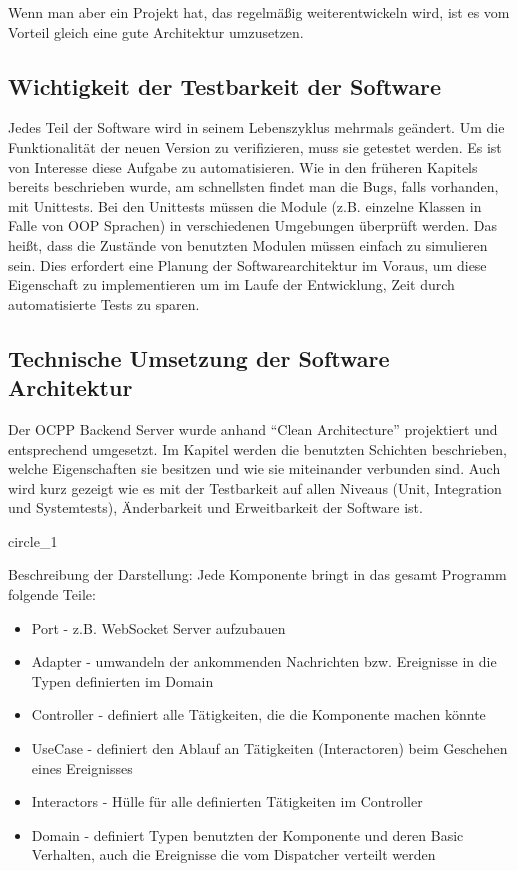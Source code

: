 \documentclass{article}
\begin{document}
    Wenn man aber ein Projekt hat, das regelmäßig weiterentwickeln wird, ist es vom Vorteil gleich eine gute Architektur umzusetzen.

    \subsection{Wichtigkeit der Testbarkeit der Software}
    Jedes Teil der Software wird in seinem Lebenszyklus mehrmals geändert. 
    Um die Funktionalität der neuen Version zu verifizieren, muss sie getestet werden.
    Es ist von Interesse diese Aufgabe zu automatisieren. 
    Wie in den früheren Kapitels bereits beschrieben wurde, am schnellsten findet man die Bugs, falls vorhanden, mit Unittests. 
    Bei den Unittests müssen die Module (z.B. einzelne Klassen in Falle von OOP Sprachen) in verschiedenen Umgebungen überprüft werden. 
    Das heißt, dass die Zustände von benutzten Modulen müssen einfach zu simulieren sein.
    Dies erfordert eine Planung der Softwarearchitektur im Voraus, 
    um diese Eigenschaft zu implementieren um im Laufe der Entwicklung, Zeit durch automatisierte Tests zu sparen.

    \newpage
    \subsection{Technische Umsetzung der Software Architektur}

    Der OCPP Backend Server wurde anhand ``Clean Architecture'' projektiert und entsprechend umgesetzt. 
    Im Kapitel werden die benutzten Schichten beschrieben, welche Eigenschaften sie besitzen und wie sie miteinander verbunden sind.
    Auch wird kurz gezeigt wie es mit der Testbarkeit auf allen Niveaus (Unit, Integration und Systemtests), 
    Änderbarkeit und Erweitbarkeit der Software ist.

    {circle_1}

    Beschreibung der Darstellung:
    Jede Komponente bringt in das gesamt Programm folgende Teile:
    \begin{itemize}
        \item Port - z.B. WebSocket Server aufzubauen
        \item Adapter  - umwandeln der ankommenden Nachrichten bzw. Ereignisse in die Typen definierten im Domain
        \item Controller - definiert alle Tätigkeiten, die die Komponente machen könnte
        \item UseCase - definiert den Ablauf an Tätigkeiten (Interactoren) beim Geschehen eines Ereignisses
        \item Interactors - Hülle für alle definierten Tätigkeiten im Controller
        \item Domain - definiert Typen benutzten der Komponente und deren Basic Verhalten, auch die Ereignisse die vom Dispatcher verteilt werden
    \end{itemize}
\end{document}
